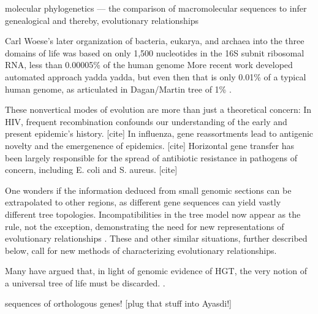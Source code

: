 
molecular phylogenetics — the comparison of macromolecular sequences to infer genealogical and thereby, evolutionary relationships

Carl Woese's later organization of bacteria, eukarya, and archaea into the three domains of life was based on only 1,500 nucleotides in the 16S subnit ribosomal RNA, less than 0.00005\% of the human genome \cite{Woese:1977vd}
More recent work developed automated approach yadda yadda\cite{Ciccarelli:2006gw}, but even then that is only 0.01\% of a typical human genome, as articulated in Dagan/Martin tree of 1\% \cite{Dagan:2006up}.

These nonvertical modes of evolution are more than just a theoretical concern:
In HIV, frequent recombination confounds our understanding of the early and present epidemic’s history. [cite]
In influenza, gene reassortments lead to antigenic novelty and the emergenence of epidemics. [cite]
Horizontal gene transfer has been largely responsible for the spread of antibiotic resistance in pathogens of concern, including E. coli and S. aureus. [cite]

One wonders if the information deduced from small genomic sections can be extrapolated to other regions, as different gene sequences can yield vastly different tree topologies.
Incompatibilities in the tree model now appear as the rule, not the exception, demonstrating the need for new representations of evolutionary relationships \autocite{Doolittle:1999,Doolittle:2006}.
These and other similar situations, further described below, call for new methods of characterizing evolutionary relationships.

Many have argued that, in light of genomic evidence of HGT, the very notion of a universal tree of life must be discarded. .

sequences of orthologous genes! [plug that stuff into Ayasdi!]

